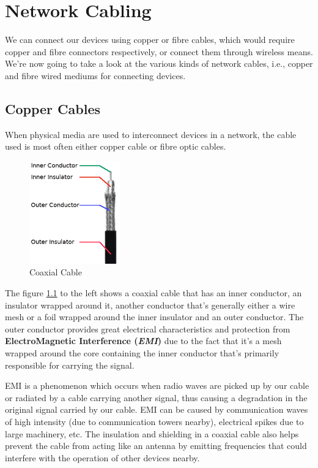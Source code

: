 \chapter{Network Cabling}
We can connect our devices using copper or fibre cables, which would require copper and fibre connectors respectively, or connect them through wireless means. We're now going to take a look at the various kinds of network cables, i.e., copper and fibre wired mediums for connecting devices. 

\section{Copper Cables}
When physical media are used to interconnect devices in a network, the cable used is most often either copper cable or fibre optic cables. 

\begin{figure}
	\centering
	\vspace{-12pt}
	\includegraphics[width=0.35\textwidth]{"Mod1/chapters/1.4.a Coaxial Cable"}
	\caption{\label{fig:coax_cable}Coaxial Cable}
	\vspace{-15pt}
\end{figure}

The figure \ref{fig:coax_cable} to the left shows a coaxial cable that has an inner conductor, an insulator wrapped around it, another conductor that's generally either a wire mesh or a foil wrapped around the inner insulator and an outer conductor. The outer conductor provides great electrical characteristics and protection from \textbf{ElectroMagnetic Interference (\textit{EMI})} due to the fact that it's a mesh wrapped around the core containing the inner conductor that's primarily responsible for carrying the signal. 

EMI is a phenomenon which occurs when radio waves are picked up by our cable or radiated by a cable carrying another signal, thus causing a degradation in the original signal carried by our cable. EMI can be caused by communication waves of high intensity (due to communication towers nearby), electrical spikes due to large machinery, etc. The insulation and shielding in a coaxial cable also helps prevent the cable from acting like an antenna by emitting frequencies that could interfere with the operation of other devices nearby. 

